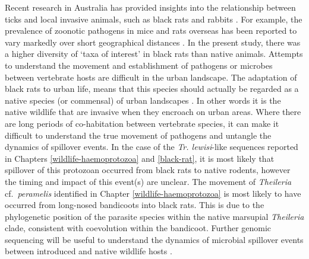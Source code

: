 \documentclass[a4paper, nobind]{templates/ociamthesis}
\begin{document}
Recent research in Australia has provided insights into the relationship between ticks and local invasive animals, such as black rats and rabbits \autocite{lydeckerPeriurbanBlackRats2019,taylorInvasiveRabbitsHost2020}.
For example, the prevalence of zoonotic pathogens in mice and rats overseas has been reported to vary markedly over short geographical distances \autocite{rothenburgerEnvironmentalFactorsZoonotic2017}.
In the present study, there was a higher diversity of `taxa of interest' in black rats than native animals.
Attempts to understand the movement and establishment of pathogens or microbes between vertebrate hosts are difficult in the urban landscape.
The adaptation of black rats to urban life, means that this species should actually be regarded as a native species (or commensal) of urban landscapes \autocite{banksEcologicalImpactsCommensal2015}.
In other words it is the native wildlife that are invasive when they encroach on urban areas.
Where there are long periods of co-habitation between vertebrate species, it can make it difficult to understand the true movement of pathogens and untangle the dynamics of spillover events.
In the case of the \emph{Tr. lewisi}-like sequences reported in Chapters \ref{wildlife-haemoprotozoa} and \ref{black-rat}, it is most likely that spillover of this protozoan occurred from black rats to native rodents, however the timing and impact of this event(s) are unclear.
The movement of \emph{Theileria} cf.~\emph{peramelis} identified in Chapter \ref{wildlife-haemoprotozoa} is most likely to have occurred from long-nosed bandicoots into black rats.
This is due to the phylogenetic position of the parasite species within the native marsupial \emph{Theileria} clade, consistent with coevolution within the bandicoot.
Further genomic sequencing will be useful to understand the dynamics of microbial spillover events between introduced and native wildlife hosts \autocite{zohdyCoevolutionEffectDriver2019}.
\end{document}
